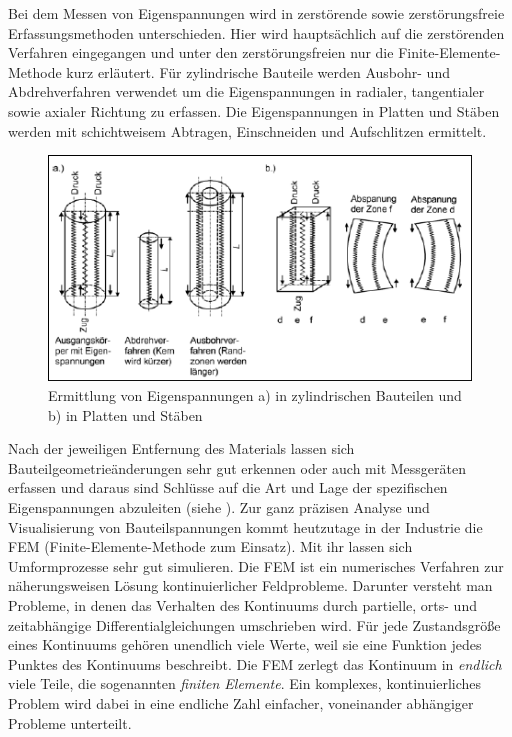 \documentclass[12pt,a4paper,parskip,twoside,BCOR5mm,headsepline]{scrartcl}
\begin{document}
\begin{description*}
Bei dem Messen von Eigenspannungen wird in zerstörende sowie zerstörungsfreie Erfassungsmethoden unterschieden. Hier wird hauptsächlich auf die zerstörenden Verfahren eingegangen und unter den zerstörungsfreien nur die Finite-Elemente-Methode kurz erläutert. Für zylindrische Bauteile werden Ausbohr- und Abdrehverfahren verwendet um die Eigenspannungen in radialer, tangentialer sowie axialer Richtung zu erfassen. Die Eigenspannungen in Platten und Stäben werden mit schichtweisem Abtragen, Einschneiden und Aufschlitzen ermittelt.\begin{figure}
  \centering
  \includegraphics[width=.8\textwidth]{eigenspanschnitt}
  \caption[Ermittlung von Eigenspannungen]{Ermittlung von Eigenspannungen a) in zylindrischen Bauteilen und b) in Platten und Stäben \autocite[36]{hu}}
  \label{fig:eigenspanschnitt}
  \end{figure}

  Nach der jeweiligen Entfernung des Materials lassen sich Bauteilgeometrieänderungen sehr gut erkennen oder auch mit Messgeräten erfassen und daraus  sind Schlüsse auf die Art und Lage der spezifischen Eigenspannungen abzuleiten (siehe ). Zur ganz präzisen Analyse  und Visualisierung von Bauteilspannungen kommt heutzutage in der Industrie  die FEM (Finite-Elemente-Methode zum Einsatz). \autocite[32-37]{hu} Mit ihr lassen sich Umformprozesse sehr gut simulieren. Die FEM ist ein numerisches Verfahren zur näherungsweisen Lösung kontinuierlicher Feldprobleme. Darunter versteht man Probleme, in denen das Verhalten des Kontinuums durch partielle, orts- und zeitabhängige Differentialgleichungen umschrieben wird. Für jede Zustandsgröße eines Kontinuums gehören unendlich viele Werte, weil sie eine Funktion jedes Punktes des Kontinuums beschreibt. Die FEM zerlegt das Kontinuum in \emph{endlich} viele Teile, die sogenannten \emph{finiten Elemente}. Ein komplexes, kontinuierliches Problem wird dabei in eine endliche Zahl einfacher, voneinander abhängiger Probleme unterteilt. \autocite[48]{fu}

\end{description*}
\end{document}
